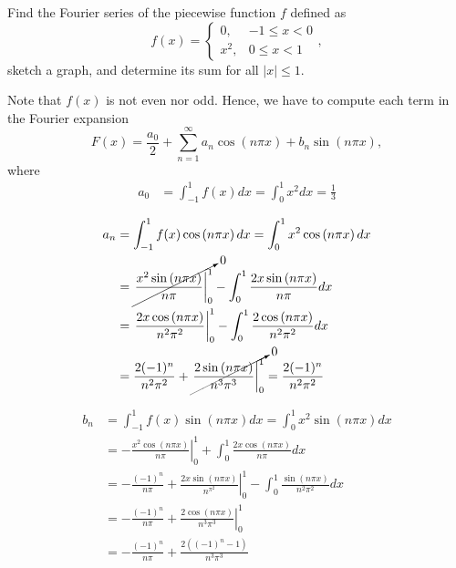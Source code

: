 \documentclass[11pt]{article}
\begin{document}
\begin{problem}
Find the Fourier series of the piecewise function $f$ defined as
\begin{equation*}
f(x) = \left\{ \begin{array}{lr} 0, & -1 \leq x < 0 \\ x^{2}, & 0 \leq x < 1 \end{array} \right.,
\end{equation*}
sketch a graph, and determine its sum for all $|x|\leq 1$.
\end{problem}
\begin{solution}
Note that $f(x)$ is not even nor odd. Hence, we have to compute each term in the Fourier expansion
\[F(x) = \frac{a_{0}}{2}+\sum_{n=1}^{\infty}a_{n}\cos\left(n\pi x\right) + b_{n}\sin \left(n\pi x\right),\]
where
\begin{equation*}
\begin{split}
a_{0} & = \int_{-1}^{1}f(x)dx = \int_{0}^{1}x^{2}dx = \frac{1}{3}
\end{split}
\end{equation*}


\begin{equation*}
\begin{split}
a_{n} & = \int_{-1}^{1}f(x)\cos \left(n\pi x\right) dx = \int_{0}^{1}x^{2}\cos \left(n\pi x\right) dx \\
      & = \cancelto{0}{\left.\frac{x^{2}\sin \left(n\pi x\right)}{n\pi}\right|_{0}^{1}} - \int_{0}^{1}\frac{2x\sin \left(n\pi x\right)}{n\pi}dx \\
      & = \left. \frac{2x\cos \left(n\pi x\right)}{n^{2}\pi^{2}}\right|_{0}^{1} - \int_{0}^{1} \frac{2\cos \left(n\pi x\right)}{n^{2}\pi^{2}}dx \\
      & = \frac{2(-1)^{n}}{n^{2}\pi^{2}} + \cancelto{0}{\left. \frac{2\sin \left(n\pi x\right)}{n^{3}\pi^{3}}\right|_{0}^{1}} = \frac{2(-1)^{n}}{n^{2}\pi^{2}}
\end{split}
\end{equation*}


\begin{equation*}
\begin{split}
b_{n} & = \int_{-1}^{1}f(x)\sin \left(n\pi x\right)dx = \int_{0}^{1}x^{2}\sin \left(n\pi x\right)dx \\
      & = -\left.\frac{x^{2}\cos \left(n\pi x\right)}{n\pi}\right|_{0}^{1} + \int_{0}^{1}\frac{2x\cos \left(n\pi x\right)}{n\pi} dx \\
      & = -\frac{(-1)^{n}}{n\pi} + \left.\frac{2x\sin\left(n\pi x\right)}{n^{\pi^{2}}}\right|_{0}^{1} - \int_{0}^{1}\frac{\sin\left(n\pi x\right)}{n^{2}\pi^{2}}dx \\
      & = -\frac{(-1)^{n}}{n\pi} + \left.\frac{2\cos\left(n\pi x\right)}{n^{3}{\pi^{3}}}\right|_{0}^{1} \\
      & = -\frac{(-1)^{n}}{n\pi} + \frac{2((-1)^{n}-1)}{n^{3}\pi^{3}}
\end{split}
\end{equation*}


\end{solution}
\end{document}
